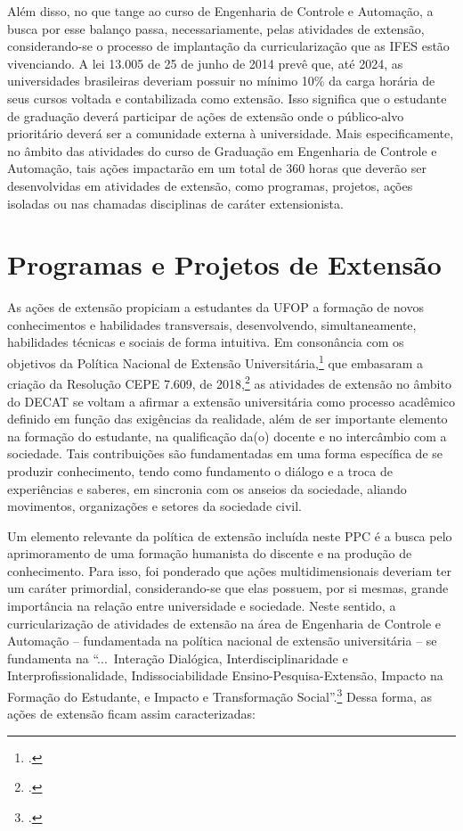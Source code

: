 \documentclass[
	12pt,				%
	openright,			%
	oneside,			%
	a4paper,			%
	english,			%
	brazil				%
	]{abntex2}
\begin{document}
Além disso, no que tange ao curso de Engenharia de Controle e Automação, a busca por esse balanço passa, necessariamente, pelas atividades de extensão, considerando-se o processo de implantação da curricularização que as IFES estão vivenciando. A lei 13.005 de 25 de junho de 2014 prevê que, até 2024, as universidades brasileiras deveriam possuir no mínimo 10\% da carga horária de seus cursos voltada e contabilizada como extensão. Isso significa que o estudante de graduação deverá participar de ações de extensão onde o público-alvo prioritário deverá ser a comunidade externa à universidade. Mais especificamente, no âmbito das atividades do curso de Graduação em Engenharia de Controle e Automação, tais ações impactarão em um total de 360 horas que deverão ser desenvolvidas em atividades de extensão, como programas, projetos, ações isoladas ou nas chamadas disciplinas de caráter extensionista.

\section{Programas e Projetos de Extensão}
As ações de extensão propiciam a estudantes da UFOP a formação de novos conhecimentos e habilidades transversais, desenvolvendo, simultaneamente, habilidades técnicas e sociais de forma intuitiva. Em consonância com os objetivos da Política Nacional de Extensão Universitária,\footcite{forproex2012} que embasaram a criação da Resolução CEPE 7.609, de 2018,\footcite[][]{resolucao-cepe-7609} as atividades de extensão no âmbito do DECAT se voltam a afirmar a extensão universitária como processo acadêmico definido em função das exigências da realidade, além de ser importante elemento na formação do estudante, na qualificação da(o) docente e no intercâmbio com a sociedade. Tais contribuições são fundamentadas em uma forma específica de se produzir conhecimento, tendo como fundamento o  diálogo e a troca de experiências e saberes, em sincronia com os anseios da sociedade, aliando movimentos, organizações e setores da sociedade civil.

Um elemento relevante da política de extensão incluída neste PPC é a busca pelo aprimoramento de uma formação humanista do discente e na produção de conhecimento. Para isso, foi ponderado que ações multidimensionais deveriam ter um caráter primordial, considerando-se que elas possuem, por si mesmas, grande importância na relação entre universidade e sociedade. Neste sentido, a curricularização de atividades de extensão na área de Engenharia de Controle e Automação -- fundamentada na política nacional de extensão universitária -- se fundamenta na ``...~Interação Dialógica, Interdisciplinaridade e Interprofissionalidade, Indissociabilidade Ensino-Pesquisa-Extensão, Impacto na Formação do Estudante, e Impacto e Transformação Social''.\footcites[][p.~29]{forproex2012}[Ver também a própria politica das engenharias da UFOP, conforme a resolução CEPE/UFOP 7609/2018, em][]{politica-eng-2022-ufop} Dessa forma, as ações de extensão ficam assim caracterizadas:
\end{document}
